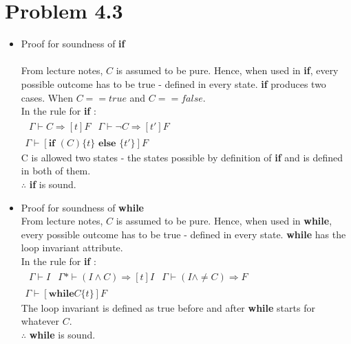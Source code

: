 \documentclass[11pt]{article}
\begin{document}
\section*{Problem 4.3}

\begin{itemize}
	\item Proof for soundness of \textbf{if}\\
	\\
	From lecture notes, $C$ is assumed to be pure. Hence, when used in \textbf{if}, every possible outcome has to be true - defined in every state. \textbf{if} produces two cases. When $C == true$ and $C == false$. \\
	In the rule for \textbf{if} : \\
	$
		\begin{matrix}
		\begin{matrix}
			\Gamma \vdash C \Rightarrow [t]F	&	\Gamma \vdash \neg C \Rightarrow [t']F 
		\end{matrix} \\ \hline
		\Gamma \vdash [\textbf{if } (C)\{ t\} \textbf{ else }\{ t'\}]F
		\end{matrix}
	$\\
	C is allowed two states - the states possible by definition of \textbf{if} and is defined in both of them.\\
	$\therefore$ \textbf{if} is sound.
	
	\item Proof for soundness of \textbf{while}\\
	From lecture notes, $C$ is assumed to be pure. Hence, when used in \textbf{while}, every possible outcome has to be true - defined in every state. \textbf{while} has the loop invariant attribute.\\
	In the rule for \textbf{if} : \\
	$
		\begin{matrix}
		\begin{matrix}
		\Gamma \vdash I	&	\Gamma * \vdash (I \land C) \Rightarrow [t]I	&	\Gamma \vdash (I \land \neq C) \Rightarrow F
		\end{matrix} \\ \hline
		\Gamma \vdash [\textbf{while} C \{ t\} ]F
		\end{matrix}
	$\\
	The loop invariant is defined as true before and after \textbf{while} starts for whatever $C$.\\
	$\therefore$ \textbf{while} is sound.
\end{itemize}
\end{document}
